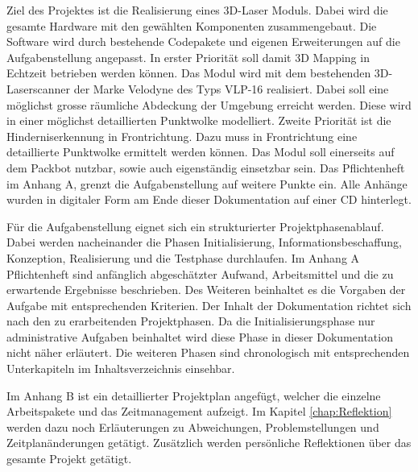 Ziel des Projektes ist die Realisierung eines 3D-Laser Moduls. Dabei wird die gesamte Hardware mit den gewählten Komponenten zusammengebaut. Die Software wird durch bestehende Codepakete und eigenen Erweiterungen auf die Aufgabenstellung angepasst. In erster Priorität soll damit 3D Mapping in Echtzeit betrieben werden können. Das Modul wird mit dem bestehenden 3D-Laserscanner der Marke Velodyne des Typs VLP-16 realisiert. Dabei soll eine möglichst grosse räumliche Abdeckung der Umgebung erreicht werden. Diese wird in einer möglichst detaillierten Punktwolke modelliert. Zweite Priorität ist die Hinderniserkennung in Frontrichtung. Dazu muss in Frontrichtung eine detaillierte Punktwolke ermittelt werden können. Das Modul soll einerseits auf dem Packbot nutzbar, sowie auch eigenständig einsetzbar sein. Das Pflichtenheft im Anhang A, grenzt die Aufgabenstellung auf weitere Punkte ein. Alle Anhänge wurden in digitaler Form am Ende dieser Dokumentation auf einer CD hinterlegt. 

Für die Aufgabenstellung eignet sich ein strukturierter Projektphasenablauf. Dabei werden nacheinander die Phasen Initialisierung, Informationsbeschaffung, Konzeption, Realisierung und die Testphase durchlaufen. Im Anhang A Pflichtenheft sind anfänglich abgeschätzter Aufwand, Arbeitsmittel und die zu erwartende Ergebnisse beschrieben. Des Weiteren beinhaltet es die Vorgaben der Aufgabe mit entsprechenden Kriterien.
Der Inhalt der Dokumentation richtet sich nach den zu erarbeitenden Projektphasen. Da die Initialisierungsphase nur administrative Aufgaben beinhaltet wird diese Phase in dieser Dokumentation nicht näher erläutert. Die weiteren Phasen sind chronologisch mit entsprechenden Unterkapiteln im Inhaltsverzeichnis einsehbar. 

Im Anhang B ist ein detaillierter Projektplan angefügt, welcher die einzelne Arbeitspakete und das Zeitmanagement aufzeigt. Im Kapitel \ref{chap:Reflektion} werden dazu noch Erläuterungen zu Abweichungen, Problemstellungen und Zeitplanänderungen getätigt. Zusätzlich werden persönliche Reflektionen über das gesamte Projekt getätigt. 







